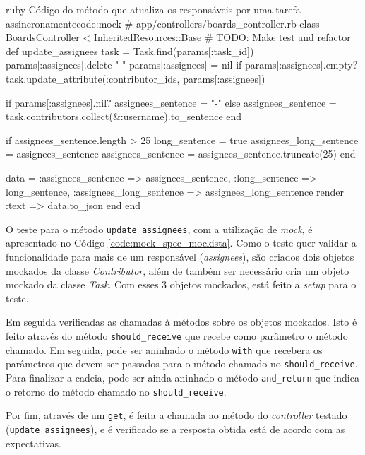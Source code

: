 \begin{mycode}{ruby}%
{Código do método que atualiza os responsáveis por uma tarefa assincronamente}{code:mock}
# app/controllers/boards_controller.rb
class BoardsController < InheritedResources::Base
  # TODO: Make test and refactor
  def update_assignees
    task = Task.find(params[:task_id])
    params[:assignees].delete "-"
    params[:assignees] = nil if params[:assignees].empty?
    task.update_attribute(:contributor_ids, params[:assignees])

    if params[:assignees].nil?
      assignees_sentence = "-"
    else
      assignees_sentence = task.contributors.collect(&:username).to_sentence
    end

    if assignees_sentence.length > 25
      long_sentence = true
      assignees_long_sentence = assignees_sentence
      assignees_sentence = assignees_sentence.truncate(25)
    end

    data = { :assignees_sentence => assignees_sentence,
             :long_sentence => long_sentence,
             :assignees_long_sentence => assignees_long_sentence }
    render :text => data.to_json
  end
end
\end{mycode}

O teste para o método \texttt{update\_assignees}, com a utilização de \textit{mock}, é apresentado no Código \ref{code:mock_spec_mockista}. Como o teste quer validar a funcionalidade para mais de um responsável (\textit{assignees}), são criados dois objetos mockados da classe \textit{Contributor}, além de também ser necessário cria um objeto mockado da classe \textit{Task}. Com esses 3 objetos mockados, está feito a \textit{setup} para o teste.

Em seguida verificadas as chamadas à métodos sobre os objetos mockados. Isto é feito através do método \texttt{should\_receive} que recebe como parâmetro o método chamado. Em seguida, pode ser aninhado o método \texttt{with} que recebera os parâmetros que devem ser passados para o método chamado no \texttt{should\_receive}. Para finalizar a cadeia, pode ser ainda aninhado o método \texttt{and\_return} que indica o retorno do método chamado no \texttt{should\_receive}.

Por fim, através de um \texttt{get}, é feita a chamada ao método do \textit{controller} testado (\texttt{update\_assignees}), e é verificado se a resposta obtida está de acordo com as expectativas.

